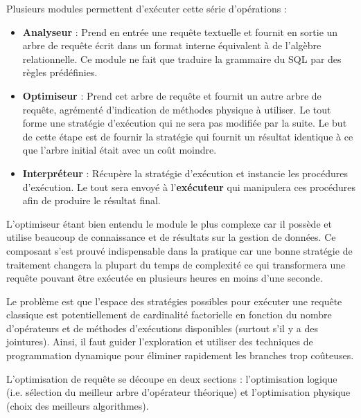 Plusieurs modules permettent d'exécuter cette série d'opérations :
\begin{itemize}
    \item \textbf{Analyseur} : Prend en entrée une requête textuelle et fournit en sortie un arbre de requête écrit dans un format interne équivalent à de l'algèbre relationnelle. Ce module ne fait que traduire la grammaire du SQL par des règles prédéfinies.
    \item \textbf{Optimiseur} : Prend cet arbre de requête et fournit un autre arbre de requête, agrémenté d'indication de méthodes physique à utiliser. Le tout forme une stratégie d'exécution qui ne sera pas modifiée par la suite. Le but de cette étape est de fournir la stratégie qui fournit un résultat identique à ce que l'arbre initial était avec un coût moindre.
    \item \textbf{Interpréteur} : Récupère la stratégie d'exécution et instancie les procédures d'exécution. Le tout sera envoyé à l'\textbf{exécuteur} qui manipulera ces procédures afin de produire le résultat final.
\end{itemize}
L'optimiseur étant bien entendu le module le plus complexe car il possède et utilise beaucoup de connaissance et de résultats sur la gestion de données. Ce composant s'est prouvé indispensable dans la pratique car une bonne stratégie de traitement changera la plupart du temps de complexité ce qui transformera une requête pouvant être exécutée en plusieurs heures en moins d'une seconde.

Le problème est que l'espace des stratégies possibles pour exécuter une requête classique est potentiellement de cardinalité factorielle en fonction du nombre d'opérateurs et de méthodes d'exécutions disponibles (surtout s'il y a des jointures). Ainsi, il faut guider l'exploration et utiliser des techniques de programmation dynamique pour éliminer rapidement les branches trop coûteuses.

L'optimisation de requête se découpe en deux sections : l'optimisation logique (i.e. sélection du meilleur arbre d'opérateur théorique) et l'optimisation physique (choix des meilleurs algorithmes).

